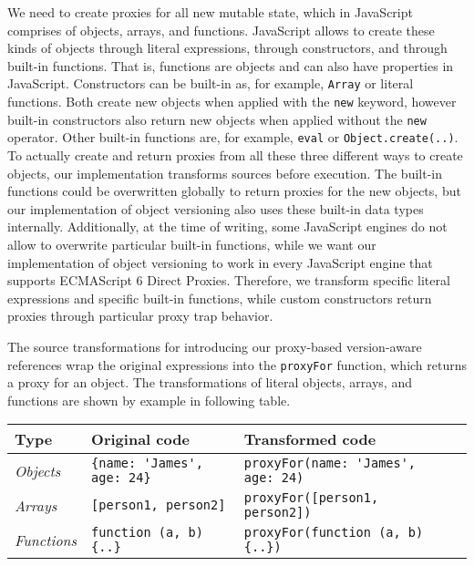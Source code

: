 We need to create proxies for all new mutable state, which in JavaScript comprises of objects, arrays, and functions.
JavaScript allows to create these kinds of objects through literal expressions, through constructors, and through built-in functions.
That is, functions are objects and can also have properties in JavaScript.
Constructors can be built-in as, for example, \lstinline{Array} or literal functions.
Both create new objects when applied with the \lstinline{new} keyword, however built-in constructors also return new objects when applied without the \lstinline{new} operator.
Other built-in functions are, for example, \lstinline{eval} or \lstinline{Object.create(..)}.
To actually create and return proxies from all these three different ways to create objects, our implementation transforms sources before execution.
The built-in functions could be overwritten globally to return proxies for the new objects, but our implementation of object versioning also uses these built-in data types internally.
Additionally, at the time of writing, some JavaScript engines do not allow to overwrite particular built-in functions, while we want our implementation of object versioning to work in every JavaScript engine that supports ECMAScript 6 Direct Proxies.
Therefore, we transform specific literal expressions and specific built-in functions, while custom constructors return proxies through particular proxy trap behavior.

The source transformations for introducing our proxy-based version-aware references wrap the original expressions into the \lstinline{proxyFor} function, which returns a proxy for an object.
The transformations of literal objects, arrays, and functions are shown by example in following table.

\begin{center}
    \begin{tabular}{| l | l | l | l |}
    \hline
    Type & Original code & Transformed code \\ \hline
    \emph{Objects} & \lstinline|{name: 'James', age: 24}| & \lstinline|proxyFor(name: 'James', age: 24)| \\ \hline
    \emph{Arrays} & \lstinline|[person1, person2]| & \lstinline|proxyFor([person1, person2])| \\ \hline
    \emph{Functions} & \lstinline|function (a, b) {..}| & \lstinline|proxyFor(function (a, b) {..})| \\ \hline
    \end{tabular}
\end{center}

